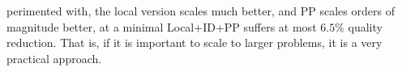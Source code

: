 \documentclass[letterpaper]{article} %
\def\
UrlFont{\rm}  %
\newcommand{\plan}[1]{\textbf{[\color{blue}PLAN:#1]}}
\newcommand{\commentout}[1]{}
\theoremstyle{definition}
\begin{document}
 perimented with, the local version scales much better, and PP scales orders of magnitude better, at a minimal  Local+ID+PP suffers at most $6.5\%$ quality reduction. That is, if it is important to scale to larger problems, it is a very practical approach.



















\end{document}
